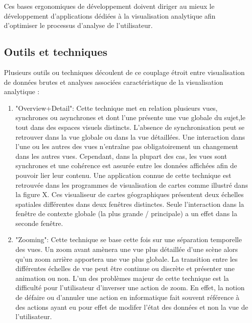 Ces bases ergonomiques de développement doivent diriger au mieux le développement d'applications dédiées à la visualisation analytique afin d'optimiser le processus d'analyse de l'utilisateur.

\subsection{Outils et techniques}

Plusieurs outils ou techniques découlent de ce couplage étroit entre visualisation de données brutes et analyses associées caractéristique de la visualisation analytique \cite{cockburn2008review}:

\begin{enumerate}
    \item "Overview+Detail": Cette technique met en relation plusieurs vues, synchrones ou asynchrones et dont l'une présente une vue globale du sujet,le tout dans des espaces visuels distincts. L'absence de synchronisation peut se retrouver dans la vue globale ou dans la vue détaillées. Une interaction dans l'une ou les autres des vues n'entraîne pas obligatoirement un changement dans les autres vues. Cependant, dans la plupart des cas, les vues sont synchrones et une cohérence est assurée entre les données affichées afin de pouvoir lier leur contenu. Une application connue de cette technique est retrouvée dans les programmes de visualisation de cartes comme illustré dans la figure X. Ces visualiseur de cartes géographiques présentent deux échelles spatiales différentes dans deux fenêtres distinctes. Seule l'interaction dans la fenêtre de contexte globale (la plus grande / principale) a un effet dans la seconde fenêtre.
    \item "Zooming": Cette technique se base cette fois sur une séparation temporelle des vues. Un zoom avant amènera une vue plus détaillée d'une scène alors qu'un zoom arrière apportera une vue plus globale. La transition entre les différentes échelles de vue peut être continue ou discrète et présenter une animation ou non. L'un des problèmes majeur de cette technique est la difficulté pour l'utilisateur d'inverser une action de zoom. En effet, la notion de défaire ou d'annuler une action en informatique fait souvent référence à des actions ayant eu pour effet de modifer l'état des données et non la vue de l'utilisateur.

\end{enumerate}
